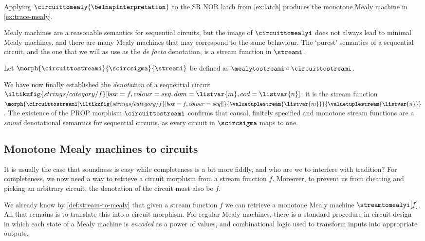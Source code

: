 \begin{example}\label{ex:mealy-translation}
    Applying \(\circuittomealy{\belnapinterpretation}\) to the SR NOR latch from
    \cref{ex:latch} produces the monotone Mealy machine in
    \cref{ex:trace-mealy}.
\end{example}

Mealy machines are a reasonable semantics for sequential circuits, but the
image of \(\circuittomealyi\) does not always lead to minimal Mealy machines,
and there are many Mealy machines that may correspond to the same behaviour.
The `purest' semantics of a sequential circuit, and the one that we will as use
as the \emph{de facto} denotation, is a stream function in \(\streami\).

\begin{definition}
    Let \(\morph{\circuittostreami}{\scircsigma}{\streami}\) be defined as
    \(\mealytostreami \circ \circuittostreami\).
\end{definition}

We have now finally established the \emph{denotation} of a sequential circuit \(
    \iltikzfig{strings/category/f}[box=f,colour=seq,dom=\listvar{m},cod=\listvar{n}]
\): it is the stream function \(
    \morph{\circuittostreami[\iltikzfig{strings/category/f}[box=f,colour=seq]]}{\valuetuplestream{\listvar{m}}}{\valuetuplestream{\listvar{n}}}
\).
The existence of the PROP morphism \(\circuittostreami\) confirms that causal,
finitely specified and monotone stream functions are a \emph{sound} denotational
semantics for sequential circuits, as every circuit in \(\scircsigma\)
maps to one.

\subsection{Monotone Mealy machines to circuits}

It is usually the case that soundness is easy while completeness is a bit more
fiddly, and who are we to interfere with tradition?
For completeness, we now need a way to retrieve a circuit morphism from a stream
function \(f\).
Moreover, to prevent us from cheating and picking an arbitrary circuit, the
denotation of the circuit must also be \(f\).

We already know by \cref{def:stream-to-mealy} that given a stream function
\(f\) we can retrieve a monotone Mealy machine \(\streamtomealyi[f]\).
All that remains is to translate this into a circuit morphism.
For regular Mealy machines, there is a standard procedure in circuit
design~\cite{kohavi2009switching} in which each state of a Mealy machine is
\emph{encoded} as a power of values, and combinational logic used to transform
inputs into appropriate outputs.

